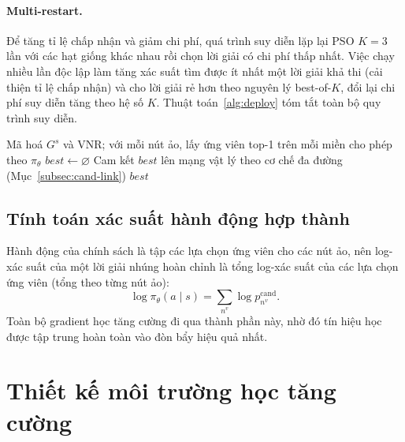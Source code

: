 \documentclass[../DoAn.tex]{subfiles}
\begin{document}
\paragraph{Multi-restart.} Để tăng tỉ lệ chấp nhận và giảm chi phí, quá trình suy diễn lặp lại PSO $K=3$ lần với các hạt giống khác nhau rồi chọn lời giải có chi phí thấp nhất. Việc chạy nhiều lần độc lập làm tăng xác suất tìm được ít nhất một lời giải khả thi (cải thiện tỉ lệ chấp nhận) và cho lời giải rẻ hơn theo nguyên lý best-of-$K$, đổi lại chi phí suy diễn tăng theo hệ số $K$. Thuật toán~\ref{alg:deploy} tóm tắt toàn bộ quy trình suy diễn.

\begin{algorithm}[H]
\caption{Suy diễn CARL-VNE qua PSO multi-restart}
\label{alg:deploy}
\SetAlgoLined
{}
Mã hoá $G^s$ và VNR; với mỗi nút ảo, lấy ứng viên top-1 trên mỗi miền cho phép theo $\pi_\theta$\;
$best \leftarrow \varnothing$\;
Cam kết $best$ lên mạng vật lý theo cơ chế đa đường (Mục~\ref{subsec:cand-link})\;
\Return $best$\;
\end{algorithm}

\subsection{Tính toán xác suất hành động hợp thành}
\label{subsec:cand-logprob}

Hành động của chính sách là tập các lựa chọn ứng viên cho các nút ảo, nên log-xác suất của một lời giải nhúng hoàn chỉnh là tổng log-xác suất của các lựa chọn ứng viên (tổng theo từng nút ảo):
\begin{equation}
    \log \pi_\theta(a \mid s) = \sum_{n^v} \log p^{\text{cand}}_{n^v}.
    \label{eq:logprob}
\end{equation}
Toàn bộ gradient học tăng cường đi qua thành phần này, nhờ đó tín hiệu học được tập trung hoàn toàn vào đòn bẩy hiệu quả nhất.

\section{Thiết kế môi trường học tăng cường}            %
\label{sec:env}
\end{document}
